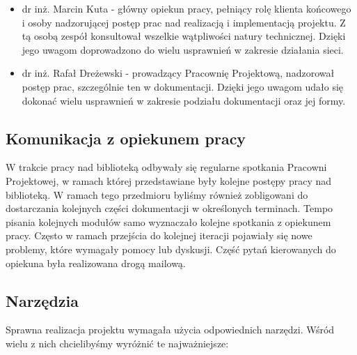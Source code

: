 \begin{itemize}
  \item dr inż. Marcin Kuta - główny opiekun pracy, pełniący rolę klienta końcowego i osoby nadzorującej
  postęp prac nad realizacją i implementacją projektu. Z tą osobą zespół konsultował wszelkie wątpliwości
  natury technicznej. Dzięki jego uwagom doprowadzono do wielu usprawnień w zakresie działania sieci.
  \item dr inż. Rafał Dreżewski - prowadzący Pracownię Projektową, nadzorował postęp prac, 
  szczególnie ten w dokumentacji. Dzięki jego uwagom udało się dokonać wielu usprawnień w zakresie podziału
  dokumentacji oraz jej formy.
\end{itemize}

\subsection{Komunikacja z opiekunem pracy}
W trakcie pracy nad biblioteką odbywały się regularne spotkania Pracowni Projektowej, w ramach której 
przedstawiane były kolejne postępy pracy nad biblioteką. W ramach tego przedmioru byliśmy również
zobligowani do dostarczania kolejnych części dokumentacji w określonych terminach. Tempo pisania kolejnych modułów
samo wyznaczało kolejne spotkania z opiekunem pracy. Często w ramach przejścia do kolejnej iteracji
pojawiały się nowe problemy, które wymagały pomocy lub dyskusji. Część pytań kierowanych do opiekuna
 była realizowana drogą mailową.
 

\subsection{Narzędzia}
Sprawna realizacja projektu wymagała użycia odpowiednich narzędzi. Wśród wielu z nich
chcielibyśmy wyróżnić te najważniejsze:

